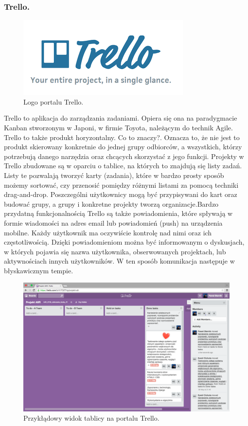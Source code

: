 \documentclass[a4paper,12pt]{article}		%
\begin{document}
\subsubsection{Trello.}

\begin{figure}[h!]
\centering
\includegraphics[scale=0.6]{Resources/Trello_Logo.png}
\caption{Logo portalu Trello.} 
\end{figure} 

Trello to aplikacja do zarządzania zadaniami. Opiera się ona na paradygmacie Kanban stworzonym w Japoni, w firmie Toyota, należącym do technik Agile. Trello to także produkt horyzontalny. Co to znaczy?. Oznacza to, że nie jest to produkt skierowany konkretnie do jednej grupy odbiorców, a wszystkich, którzy potrzebują danego narzędzia oraz chcących skorzystać z jego funkcji. Projekty w Trello zbudowane są w oparciu o tablice, na których to znajdują się listy zadań. Listy te pozwalają tworzyć karty (zadania), które w bardzo prosty sposób możemy sortować, czy przenosić pomiędzy różnymi listami za pomocą techniki drag-and-drop. Poszczególni użytkownicy mogą być przypisywani do kart oraz budować grupy, a grupy i konkretne projekty tworzą organizacje.Bardzo przydatną funkcjonalnością Trello są także powiadomienia, które spływają w formie wiadomości na adres email lub powiadomień (push) na urządzenia mobilne. Każdy użytkownik ma oczywiście kontrolę nad nimi oraz ich częstotliwością. Dzięki powiadomieniom można być informowanym o dyskusjach, w których pojawia się nazwa użytkownika, obserwowanych projektach, lub aktywnościach innych użytkowników. W ten sposób komunikacja następuje w błyskawicznym tempie.

\begin{figure}[h!]
\centering
\includegraphics[scale=0.2]{Resources/Trello_Zrzut.png}
\caption{Przykłądowy widok tablicy na portalu Trello.} 
\end{figure} 
\end{document}
